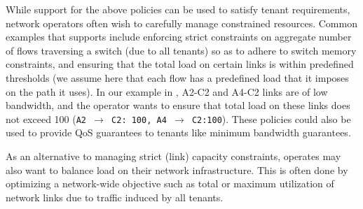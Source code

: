  While
  support for the above policies can be used to satisfy tenant 
  requirements, network operators often wish to
  carefully manage constrained resources. 
  Common examples that \Name
  supports include enforcing strict constraints on aggregate number of
  flows traversing a switch (due to all tenants) so as to adhere to
  switch memory constraints, and ensuring that the total load on
  certain links is within predefined thresholds (we assume here that
  each flow has a predefined load that it imposes on the path it
  uses). In our example in , A2-C2 and A4-C2
  links are of low bandwidth, and the operator wants to ensure that
  total load on these links does not exceed 100 
  (\texttt{A2 $\rightarrow$ C2: 100, A4 $\rightarrow$ C2:100}). These 
  policies could also be used to provide QoS guarantees to tenants like
  minimum bandwidth guarantees. 

 As an alternative to
  managing strict (link) capacity constraints, operates may also want
  to balance load on their network infrastructure. This is often done
  by optimizing a network-wide objective such as total or maximum
  utilization of network links due to traffic induced by all tenants.
  
  

